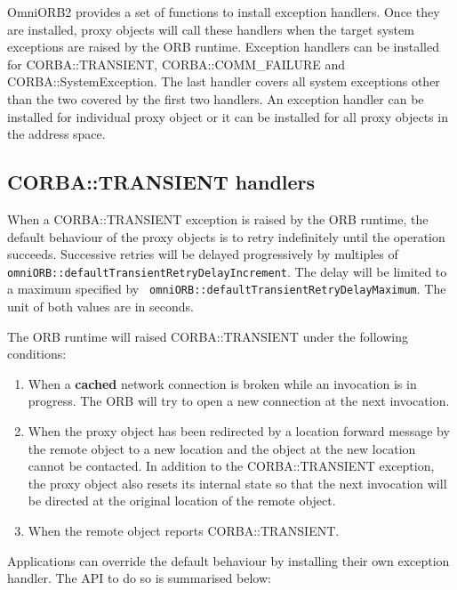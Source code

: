 \documentclass[11pt,twoside,onecolumn]{book}
\begin{document}
OmniORB2 provides a set of functions to install exception handlers. Once
they are installed, proxy objects will call these handlers when the target
system exceptions are raised by the ORB runtime. Exception handlers can be
installed for CORBA::TRANSIENT, CORBA::COMM\_FAILURE and
CORBA::SystemException. The last handler covers all system exceptions other
than the two covered by the first two handlers. An exception handler can be
installed for individual proxy object or it can be installed for all proxy
objects in the address space.


\subsection{CORBA::TRANSIENT handlers}

When a CORBA::TRANSIENT exception is raised by the ORB runtime, the default
behaviour of the proxy objects is to retry indefinitely until the operation
succeeds. Successive retries will be delayed progressively by multiples of
{\tt omniORB::defaultTransientRetryDelayIncrement}. The delay will be
limited to a maximum specified by {\tt
omniORB::defaultTransientRetryDelayMaximum}. The unit of both values are in
seconds.

The ORB runtime will raised CORBA::TRANSIENT under the following
conditions:

\begin{enumerate}

\item When a {\bf cached} network connection is broken while an invocation
is in progress. The ORB will try to open a new connection at the next
invocation. 

\item When the proxy object has been redirected by a location forward
message by the remote object to a new location and the object at the new
location cannot be contacted. In addition to the CORBA::TRANSIENT
exception, the proxy object also resets its internal state so that the next
invocation will be directed at the original location of the remote object.

\item When the remote object reports CORBA::TRANSIENT. 

\end{enumerate}

Applications can override the default behaviour by installing their own
exception handler. The API to do so is summarised below:
\end{document}
